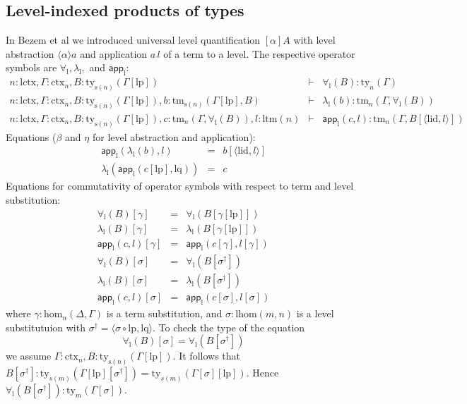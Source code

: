 \documentclass[11pt,a4paper]{article}
\theoremstyle{plain}
\theoremstyle{definition}
\newcommand{\app}[2]{{#1\,#2}} %
\def\lhom{\mathrm{lhom}}
\def\sub{\mathrm{hom}}
\def\lctx{\mathrm{lctx}}
\def\ltm{\mathrm{ltm}}
\def\lp{\mathrm{lp}}
\def\lq{\mathrm{lq}}
\def\s{\mathrm{s}}
\def\lid{\mathrm{lid}}
\newcommand{\ctx}{\mathrm{ctx}}
\newcommand{\ty}{\mathrm{ty}}
\newcommand{\tm}{\mathrm{tm}}
\newcommand{\tuple}[1]{\langle #1 \rangle}
\def\app{\mathsf{app}}
\begin{document}
\subsection{Level-indexed products of types}
\def\l{\mathrm{l}}
In Bezem et al \cite{BezemCDE22} we introduced
universal level quantification $[\alpha]A$ with level abstraction $\tuple{\alpha}a$ and application $a\,l$ of a term to a level. The respective operator symbols are $\forall_\l, \lambda_\l,$ and $\app_\l$:
\begin{eqnarray*}
n : \lctx, \Gamma : \ctx_n, B : \ty_{\s(n)}(\Gamma[\lp])&\vdash& \forall_\l(B) : \ty_n(\Gamma)\\
n : \lctx, \Gamma : \ctx_n, B : \ty_{\s(n)}(\Gamma[\lp]), b : \tm_{\s(n)}(\Gamma[\lp], B) &\vdash& \lambda_\l(b) : \tm_n(\Gamma,\forall_\l(B))\\
n : \lctx, \Gamma : \ctx_n, B : \ty_{\s(n)}(\Gamma[\lp]), c :  \tm_n(\Gamma,\forall_\l(B)), l : \ltm(n) &\vdash& \app_\l(c,l) : \tm_n(\Gamma, B[\tuple{\lid,l}])
\end{eqnarray*}
Equations ($\beta$ and $\eta$ for level abstraction and application):
 \begin{eqnarray*}
 \app_\l(\lambda_\l(b),l) &=& b[\tuple{\lid,l}]\\
 \lambda_\l(\app_\l(c[\lp],\lq)) &=& c
 \end{eqnarray*}
 Equations for commutativity of operator symbols with respect to term and level substitution:
 \begin{eqnarray*}
 \forall_\l(B)[ \gamma ] &=& \forall_\l(B[ \gamma[\lp]])\\
 \lambda_\l(B)[ \gamma ] &=& \lambda_\l(B[ \gamma[\lp]])\\
 \app_\l(c,l)[ \gamma ] &=& \app_\l(c[ \gamma ] ,l[ \gamma ] )\\
 \forall_\l(B)[ \sigma ] &=& \forall_\l(B[ \sigma^{\dagger}])\\
 \lambda_\l(B)[ \sigma ] &=& \lambda_\l(B[ \sigma^{\dagger}])\\
\app_\l(c,l)[ \sigma ] &=& \app_\l(c[ \sigma ] ,l[ \sigma ] )
\end{eqnarray*}
where $\gamma : \sub_n(\Delta,\Gamma)$ is a term substitution, and $\sigma : \lhom(m,n)$ is a level substitutuion with $\sigma^\dagger = \tuple{\sigma \circ \lp, \lq}$.
To check the type of the equation
$$ \forall_\l(B)[ \sigma ] = \forall_\l(B[ \sigma^{\dagger}])$$ we assume $\Gamma : \ctx_n, B : \ty_{\s(n)}(\Gamma[\lp])$. It follows that $B[\sigma^\dagger] : \ty_{s(m)}(\Gamma[\lp][\sigma^\dagger]) = \ty_{s(m)}(\Gamma[\sigma][\lp])$. Hence
$\forall_\l(B[ \sigma^{\dagger}]) : \ty_m(\Gamma[\sigma])$.
\end{document}
